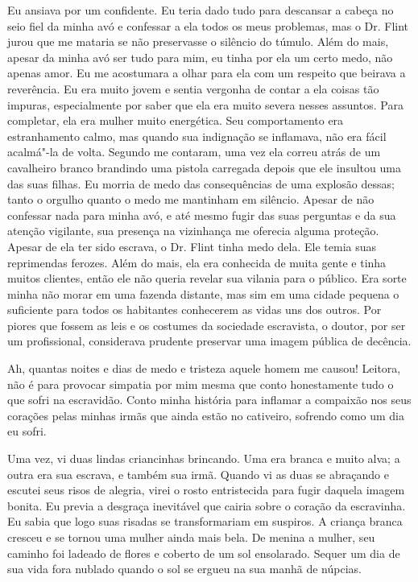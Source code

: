 Eu ansiava por um confidente. Eu teria
dado tudo para descansar a cabeça no seio fiel da minha avó e confessar
a ela todos os meus problemas, mas o Dr. Flint jurou que me mataria se
não preservasse o silêncio do túmulo. Além do mais, apesar da minha avó
ser tudo para mim, eu tinha por ela um certo medo, não apenas amor. Eu
me acostumara a olhar para ela com um respeito que beirava a reverência.
Eu era muito jovem e sentia vergonha de contar a ela coisas tão impuras,
especialmente por saber que ela era muito severa nesses assuntos. Para
completar, ela era mulher muito energética. Seu comportamento era
estranhamento calmo, mas quando sua indignação se inflamava, não era
fácil acalmá"-la de volta. Segundo me contaram, uma vez ela correu atrás
de um cavalheiro branco brandindo uma pistola carregada depois que ele
insultou uma das suas filhas. Eu morria de medo das consequências de uma
explosão dessas; tanto o orgulho quanto o medo me mantinham em silêncio.
Apesar de não confessar nada para minha avó, e até mesmo fugir das suas
perguntas e da sua atenção vigilante, sua presença na vizinhança me
oferecia alguma proteção. Apesar de ela ter sido escrava, o Dr. Flint
tinha medo dela. Ele temia suas reprimendas ferozes. Além do mais, ela
era conhecida de muita gente e tinha muitos clientes, então ele não
queria revelar sua vilania para o público. Era sorte minha não morar em
uma fazenda distante, mas sim em uma cidade pequena o suficiente para
todos os habitantes conhecerem as vidas uns dos outros. Por piores que
fossem as leis e os costumes da sociedade escravista, o doutor, por ser
um profissional, considerava prudente preservar uma imagem pública de
decência.

Ah, quantas noites e dias de medo e
tristeza aquele homem me causou! Leitora, não é para provocar simpatia
por mim mesma que conto honestamente tudo o que sofri na escravidão.
Conto minha história para inflamar a compaixão nos seus corações pelas
minhas irmãs que ainda estão no cativeiro, sofrendo como um dia eu
sofri.

Uma vez, vi duas lindas criancinhas
brincando. Uma era branca e muito alva; a outra era sua escrava, e
também sua irmã. Quando vi as duas se abraçando e escutei seus risos de
alegria, virei o rosto entristecida para fugir daquela imagem bonita. Eu
previa a desgraça inevitável que cairia sobre o coração da escravinha.
Eu sabia que logo suas risadas se transformariam em suspiros. A criança
branca cresceu e se tornou uma mulher ainda mais bela. De menina a
mulher, seu caminho foi ladeado de flores e coberto de um sol
ensolarado. Sequer um dia de sua vida fora nublado quando o sol se
ergueu na sua manhã de núpcias.

